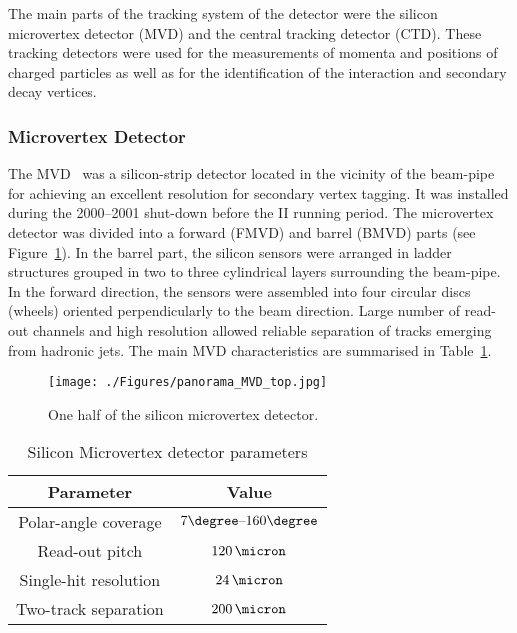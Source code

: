 The main parts of the tracking system of the \zeus detector were the silicon microvertex detector (MVD) and the central tracking detector (CTD). These tracking detectors were used for the measurements of momenta and positions of charged particles as well as for the identification of the interaction and secondary decay vertices.

\subsubsection{Microvertex Detector}
\label{subsubsec:mvd}
The MVD~\cite{nim:a581:656} was a silicon-strip detector located in the vicinity of the beam-pipe for achieving an excellent resolution for secondary vertex tagging. It was installed during the 2000--2001 shut-down before the \hera II running period. The microvertex detector was divided into a forward (FMVD) and barrel (BMVD) parts (see Figure~\ref{fig:MVD_artistic}). In the barrel part, the silicon sensors were arranged in ladder structures grouped in two to three cylindrical layers surrounding the beam-pipe. In the forward direction, the sensors were assembled into four circular discs (wheels) oriented perpendicularly to the beam direction. Large number of read-out channels and high resolution allowed reliable separation of tracks emerging from hadronic jets. The main MVD characteristics are summarised in Table~\ref{tab:mvdgeomparameters}. 

\begin{figure}[htbp]
	\centering
		\texttt{[image: ./Figures/panorama\_MVD\_top.jpg]}
	\caption{One half of the silicon microvertex detector.}
	\label{fig:MVD_artistic}
\end{figure}

\begin{table}[htbp]
	\centering
\begin{tabular}{ | c | c | }
     \hline
      Parameter & Value \\
			\hline
			\hline
			Polar-angle coverage & $7\degree \mbox{--} 160\degree$ \\ \hline
      Read-out pitch & $120\,\micron$  \\ \hline
			Single-hit resolution & $24\,\micron$ \\ \hline 
			Two-track separation & $200\,\micron$ \\
      \hline
     \end{tabular}
	\caption{Silicon Microvertex detector parameters}
	\label{tab:mvdgeomparameters}
\end{table}

